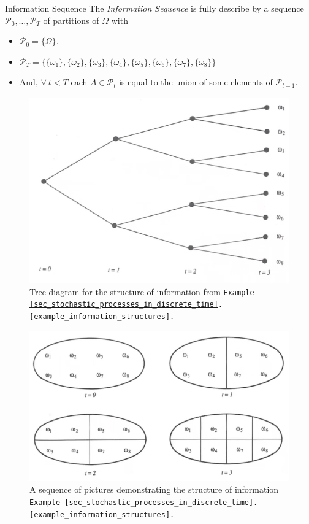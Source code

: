 \documentclass[11pt,a4paper]{article}
\begin{document}
  \begin{definition}{Information Sequence}
    The \textit{Information Sequence} is fully describe by a sequence $\mathcal{P}_0,\dots,\mathcal{P}_T$ of partitions of $\Omega$ with
    \begin{itemize}
      \item $\mathcal{P}_0=\{\Omega\}$.
      \item $\mathcal{P}_T=\big\{\{\omega_1\},\{\omega_2\},\{\omega_3\},\{\omega_4\},\{\omega_5\},\{\omega_6\},\{\omega_7\},\{\omega_8\}\big\}$
      \item And, $\forall\ t<T$ each $A\in\mathcal{P}_t$ is equal to the union of some elements of $\mathcal{P}_{t+1}$.
    \end{itemize}
  \end{definition}

  \begin{figure}[H]
    \centering\includegraphics[width=.7\textwidth]{TreeOfInformationStructures.PNG}
    \caption{Tree diagram for the structure of information from \texttt{Example \ref{sec_stochastic_processes_in_discrete_time}.\ref{example_information_structures}.}}
    \label{fig_tree_diagram_of_information_structure}
  \end{figure}

  \begin{figure}[H]
    \centering\includegraphics[width=.7\textwidth]{PicturesOfInformationStructures.PNG}
    \caption{A sequence of pictures demonstrating the structure of information \texttt{Example \ref{sec_stochastic_processes_in_discrete_time}.\ref{example_information_structures}.}}
    \label{fig_sequence_of_pictures_of_information_structure}
  \end{figure}
\end{document}
